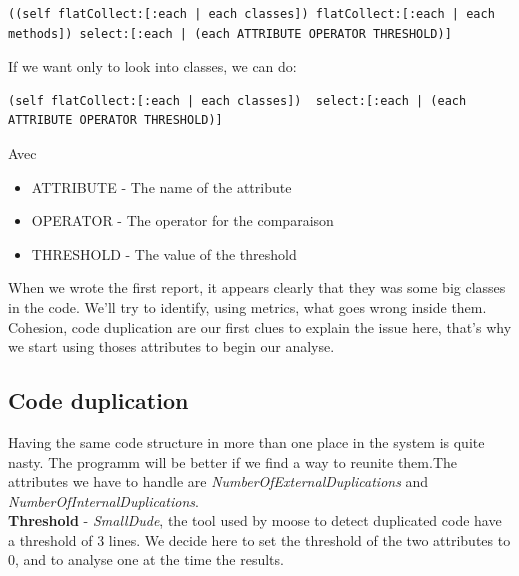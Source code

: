 \documentclass[11pt,a4paper]{article}
\begin{document}
\begin{lstlisting}
((self flatCollect:[:each | each classes]) flatCollect:[:each | each methods]) select:[:each | (each ATTRIBUTE OPERATOR THRESHOLD)] 
\end{lstlisting}

If we want only to look into classes, we can do:\\
\begin{lstlisting}
(self flatCollect:[:each | each classes])  select:[:each | (each ATTRIBUTE OPERATOR THRESHOLD)]
\end{lstlisting}
Avec
\begin{itemize}
\item ATTRIBUTE - The name of the attribute
\item OPERATOR - The operator for the comparaison
\item THRESHOLD - The value of the threshold
 \end{itemize}

When we wrote the first report, it appears clearly that they was some big classes in the code. We'll try to identify, using metrics, what goes wrong inside them. Cohesion, code duplication are our first clues to explain the issue here, that's why we start using thoses attributes to begin our analyse.\\ 

\subsection{Code duplication}
Having the same code structure in more than one place in the system is quite nasty. The programm will be better if we find a way to reunite them.The attributes we have to handle are \textit{NumberOfExternalDuplications} and \textit{NumberOfInternalDuplications}.\\

\textbf{Threshold} - \textit{SmallDude}, the tool used by moose to detect duplicated code have a threshold of 3 lines. We decide here to set the threshold of the two attributes to 0, and to analyse one at the time the results.\\
\end{document}
